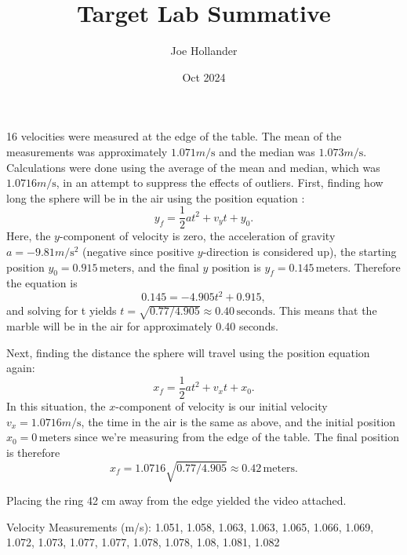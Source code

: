 \documentclass{article}
\title{Target Lab Summative}
\author{Joe Hollander}
\date{Oct 2024}
\begin{document}
\maketitle 


16 velocities were measured at the edge of the table. 
The mean of the measurements was approximately $1.071 \si{m\per\second}$ and the median was $1.073\si{m\per\second}$. 
Calculations were done using the average of the mean and median, which was $1.0716 \si{m\per\second}$, in an attempt to suppress the effects of outliers. 
First, finding how long the sphere will be in the air using the position equation :
\[
y_f = \frac{1}{2}at^2 + v_yt + y_0.
\]
Here, the $y$-component of velocity is zero,
the acceleration of gravity $a = -9.81 \si{m\per\second^2}$ (negative since positive $y$-direction is considered up), the starting position $y_0 = 0.915 \, \text{meters}$,
and the final $y$ position is $y_f = 0.145  \, \text{meters}$.
Therefore the equation is 
\[
0.145 = -4.905t^2 + 0.915, 
\]
and solving for t yields 
$t = \sqrt{0.77/4.905} \approx 0.40 \, \text{seconds}.$
This means that the marble will be in the air for approximately 0.40 seconds. 

Next, finding the distance the sphere will travel using the position equation again:
\[
x_f = \frac{1}{2}at^2 + v_xt + x_0.
\]
In this situation, the $x$-component of velocity is our initial velocity $v_x = 1.0716 \si{m\per\second}$,
the time in the air is the same as above, 
and the initial position $x_0 = 0 \, \text{meters}$ since we're measuring from the edge of the table.
The final position is therefore 
\[
x_f = 1.0716\sqrt{0.77/4.905} \approx 0.42 \, \text{meters}. 
\]

Placing the ring 42 cm away from the edge yielded the video attached. 

\medskip

Velocity Measurements (m/s):
1.051, 1.058, 1.063, 1.063, 1.065, 1.066, 1.069, 1.072, 1.073, 1.077, 1.077, 1.078, 1.078, 1.08, 1.081, 1.082
\end{document}
